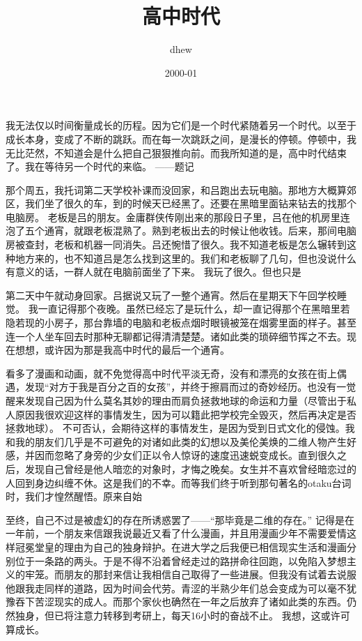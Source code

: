 \documentclass{article}
\title{高中时代}
\author{dhew}
\date{2000-01}
\begin{document}

\maketitle


\Large

﻿我无法仅以时间衡量成长的历程。因为它们是一个时代紧随着另一个时代。以至于成长本身，变成了不断的跳跃。而在每一次跳跃之间，是漫长的停顿。停顿中，我无比茫然，不知道会是什么把自己狠狠推向前。而我所知道的是，高中时代结束了。我在等待另一个时代的来临。 
——题记 

那个周五，我托词第二天学校补课而没回家，和吕跑出去玩电脑。那地方大概算郊区，我们坐了很久的车，到的时候天已经黑了。还要在黑暗里面钻来钻去的找那个电脑房。 
老板是吕的朋友。金庸群侠传刚出来的那段日子里，吕在他的机房里连泡了五个通宵，就跟老板混熟了。熟到老板出去的时候让他收钱。后来，那间电脑房被查封，老板和机器一同消失。吕还惋惜了很久。我不知道老板是怎么辗转到这种地方来的，也不知道吕是怎么找到这里的。我们和老板聊了几句，但也没说什么有意义的话，一群人就在电脑前面坐了下来。 
我玩了很久。但也只是

\newpage 

第二天中午就动身回家。吕据说又玩了一整个通宵。然后在星期天下午回学校睡觉。 
我一直记得那个夜晚。虽然已经忘了是玩什么，却一直记得那个在黑暗里若隐若现的小房子，那台靠墙的电脑和老板点烟时眼镜被笼在烟雾里面的样子。甚至连一个人坐车回去时那种无聊都记得清清楚楚。诸如此类的琐碎细节挥之不去。现在想想，或许因为那是我高中时代的最后一个通宵。 

看多了漫画和动画，就不免觉得高中时代平淡无奇，没有和漂亮的女孩在街上偶遇，发现“对方于我是百分之百的女孩”，并终于擦肩而过的奇妙经历。也没有一觉醒来发现自己因为什么莫名其妙的理由而肩负拯救地球的命运和力量（尽管出于私人原因我很欢迎这样的事情发生，因为可以籍此把学校完全毁灭，然后再决定是否拯救地球）。 
不可否认，会期待这样的事情发生，是因为受到日式文化的侵蚀。我和我的朋友们几乎是不可避免的对诸如此类的幻想以及美伦美焕的二维人物产生好感，并因而忽略了身旁的少女们正以令人惊讶的速度迅速蜕变成长。直到很久之后，发现自己曾经是他人暗恋的对象时，才悔之晚矣。女生并不喜欢曾经暗恋过的人回到身边纠缠不休。这是我们的不幸。而等我们终于听到那句著名的otaku台词时，我们才惶然醒悟。原来自始

\newpage 

至终，自己不过是被虚幻的存在所诱惑罢了——“那毕竟是二维的存在。” 
记得是在一年前，一个朋友来信跟我说最近又看了什么漫画，并且用漫画少年不需要爱情这样冠冕堂皇的理由为自己的独身辩护。在进大学之后我便已相信现实生活和漫画分别位于一条路的两头。于是不得不沿着曾经走过的路拼命往回跑，以免陷入梦想主义的牢笼。而朋友的那封来信让我相信自己取得了一些进展。但我没有试着去说服他跟我走同样的道路，因为时间会代劳。青涩的半熟少年们总会变成为可以毫不犹豫吞下苦涩现实的成人。而那个家伙也确然在一年之后放弃了诸如此类的东西。仍然独身，但已将注意力转移到考研上，每天16小时的奋战不止。 
我想，这或许可算成长。 
\end{document}
